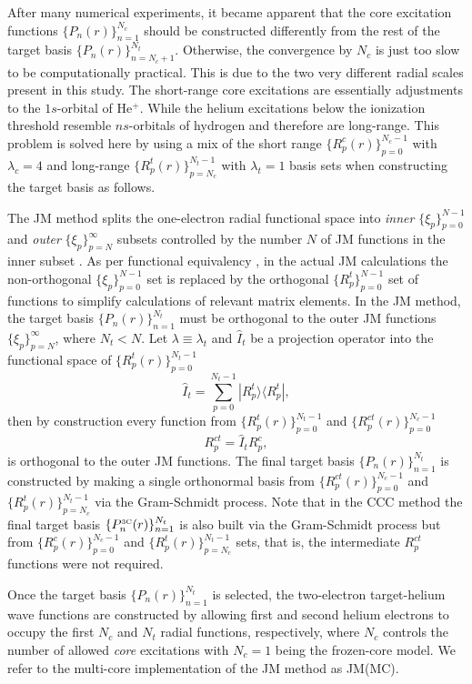 \documentclass[aip
, pra
, showpacs
, aps
, twocolumn
, groupedaddress
, floatfix
]{revtex4}
\newcommand{\beq}{\begin{equation}}
\newcommand{\eeq}{\end{equation}}
\begin{document}
After many numerical experiments, it became apparent that the core excitation functions $\{P_n(r)\}_{n=1}^{N_c}$ should be constructed differently from the rest of the target basis
$\{P_n(r)\}_{n=N_c+1}^{N_t}$. Otherwise, the convergence by $N_c$ is just too slow to be computationally practical.
This is due to the two very different radial scales present in this study.
The short-range core excitations are essentially adjustments to the $1s$-orbital of He$^+$.
While the helium excitations below the ionization threshold resemble $ns$-orbitals of hydrogen and therefore are long-range.
This problem is solved here by using a mix of the short range $\{R^c_p(r)\}_{p=0}^{N_c-1}$ with $\lambda_c=4$
and long-range $\{R^t_p(r)\}_{p=N_c}^{N_t-1}$ with $\lambda_t=1$  basis sets
when constructing the target basis as follows.


The JM method splits the one-electron radial functional space into {\em inner} $\{\xi_p\}_{p=0}^{N-1}$
and {\em outer} $\{\xi_p\}_{p=N}^\infty$
subsets controlled by the number $N$ of JM functions in the inner subset \cite{HY74p1201,BR76p1491}.
As per functional equivalency \cite{KB10p022708}, in the actual JM calculations the non-orthogonal $\{\xi_p\}_{p=0}^{N-1}$ set is replaced by
the orthogonal $\{R^t_p\}_{p=0}^{N-1}$ set of functions to simplify calculations of relevant matrix elements.
In the JM method, the target basis $\{P_n(r)\}_{n=1}^{N_t}$ must be orthogonal to the outer JM functions $\{\xi_p\}_{p=N}^\infty$, where $N_t<N$.
Let $\lambda \equiv \lambda_t$ and $\hat{I}_t$ be a projection operator into the functional space of $\{R^t_p(r)\}_{p=0}^{N_t-1}$
\beq
\hat{I}_t = \sum_{p=0}^{N_t-1} | R_p^t \rangle \langle R_p^t |,
\label{I_t}
\eeq
then by construction every function from $\{R^t_p(r)\}_{p=0}^{N_t-1}$ and  $\{R^{ct}_p(r)\}_{p=0}^{N_c-1}$
\beq
R^{ct}_p = \hat{I}_t R^{c}_p,
\eeq
is orthogonal to the outer JM functions.
The final target basis $\{P_n(r)\}_{n=1}^{N_t}$ is constructed by making a single orthonormal basis from
$\{R^{ct}_p(r)\}_{p=0}^{N_c-1}$ and $\{R^t_p(r)\}_{p=N_c}^{N_t-1}$
via the Gram-Schmidt process.
Note that in the CCC method the final target basis
$\{P^{\mbox{{\tiny 3C}}}_n(r)\}_{n=1}^{N_t}$ is also built via the Gram-Schmidt process but from
$\{R^{c}_p(r)\}_{p=0}^{N_c-1}$ and $\{R^t_p(r)\}_{p=N_c}^{N_t-1}$ sets, that is, the intermediate $R^{ct}_p$ functions were not required.



Once the target basis $\{P_n(r)\}_{n=1}^{N_t}$ is selected,
the two-electron target-helium wave functions are constructed by allowing first and second helium electrons to occupy the first $N_c$ and $N_t$ radial functions, respectively,
where $N_c$ controls the number of allowed {\em core} excitations with $N_c=1$ being the frozen-core model.
We refer to the multi-core implementation of the JM method as JM(MC).
\end{document}
